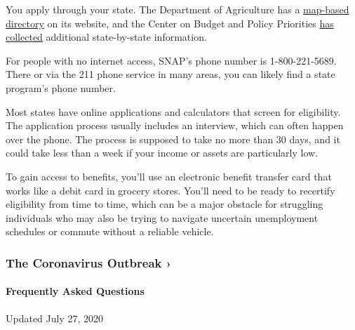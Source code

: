 You apply through your state. The Department of Agriculture has a
\href{https://www.fns.usda.gov/snap/state-directory}{map-based
directory} on its website, and the Center on Budget and Policy
Priorities
\href{https://www.cbpp.org/research/food-assistance/snap-state-by-state-data-fact-sheets-and-resources}{has
collected} additional state-by-state information.

For people with no internet access, SNAP's phone number is
1-800-221-5689. There or via the 211 phone service in many areas, you
can likely find a state program's phone number.

Most states have online applications and calculators that screen for
eligibility. The application process usually includes an interview,
which can often happen over the phone. The process is supposed to take
no more than 30 days, and it could take less than a week if your income
or assets are particularly low.

To gain access to benefits, you'll use an electronic benefit transfer
card that works like a debit card in grocery stores. You'll need to be
ready to recertify eligibility from time to time, which can be a major
obstacle for struggling individuals who may also be trying to navigate
uncertain unemployment schedules or commute without a reliable vehicle.

\href{https://www.nytimes3xbfgragh.onion/news-event/coronavirus?action=click\&pgtype=Article\&state=default\&region=MAIN_CONTENT_3\&context=storylines_faq}{}

\hypertarget{the-coronavirus-outbreak-}{%
\subsubsection{The Coronavirus Outbreak
›}\label{the-coronavirus-outbreak-}}

\hypertarget{frequently-asked-questions}{%
\paragraph{Frequently Asked
Questions}\label{frequently-asked-questions}}

Updated July 27, 2020

